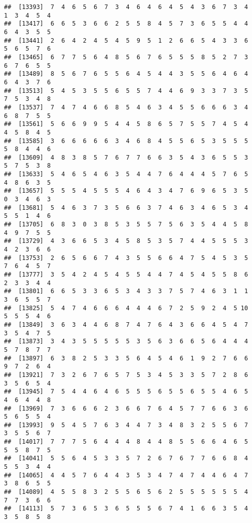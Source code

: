 \documentclass[
]{book}
\begin{document}
\begin{verbatim}
##  [13393]  7  4  6  5  6  7  3  4  6  4  6  4  5  4  3  6  7  3  4  1  3  4  5  4
##  [13417]  6  6  5  3  6  6  2  5  5  8  4  5  7  3  6  5  5  4  4  6  4  3  5  5
##  [13441]  2  6  4  2  4  5  4  5  9  5  1  2  6  6  5  4  3  3  6  5  6  5  7  6
##  [13465]  6  7  7  5  6  4  8  5  6  7  6  5  5  5  8  5  2  7  3  6  7  6  5  5
##  [13489]  8  5  6  7  6  5  5  6  4  5  4  4  3  5  5  6  4  6  4  6  4  3  7  6
##  [13513]  5  4  5  3  5  5  6  5  5  7  4  4  6  9  3  3  7  3  5  7  5  3  4  8
##  [13537]  7  4  7  4  6  6  8  5  4  6  3  4  5  5  6  6  6  3  4  6  8  7  5  5
##  [13561]  5  6  6  9  9  5  4  4  5  8  6  5  7  5  5  7  4  5  4  4  5  8  4  5
##  [13585]  3  6  6  6  6  6  3  4  6  8  4  5  5  6  5  3  5  5  5  5  8  4  4  6
##  [13609]  4  8  3  8  5  7  6  7  7  6  6  3  5  4  3  6  5  5  3  5  7  5  3  8
##  [13633]  5  4  6  5  4  6  3  5  4  4  7  6  4  4  4  5  7  6  5  4  8  6  3  5
##  [13657]  5  5  5  4  5  5  5  4  6  4  3  4  7  6  9  6  5  3  5  0  3  4  6  3
##  [13681]  5  4  6  3  7  3  5  6  6  3  7  4  6  3  4  6  5  3  4  5  5  1  4  6
##  [13705]  6  8  3  0  3  8  5  3  5  5  7  5  6  3  5  4  4  5  8  4  9  7  5  5
##  [13729]  4  3  6  6  5  3  4  5  8  5  3  5  7  4  4  5  5  5  3  4  2  3  6  6
##  [13753]  2  6  5  6  6  7  4  3  5  5  6  6  4  7  5  4  5  3  5  7  6  4  5  7
##  [13777]  3  5  4  2  4  5  4  5  5  4  4  7  4  5  4  5  5  8  6  2  3  3  4  4
##  [13801]  6  6  5  3  3  6  5  3  4  3  3  7  5  7  4  6  3  1  1  3  6  5  5  7
##  [13825]  5  4  7  4  6  6  6  4  4  4  6  7  2  5  9  2  4  5 10  5  5  5  4  6
##  [13849]  3  6  3  4  4  6  8  7  4  7  6  4  3  6  6  4  5  4  7  3  5  4  7  5
##  [13873]  3  4  3  5  5  5  5  5  3  5  6  3  6  6  5  6  4  4  4  5  7  8  7  7
##  [13897]  6  3  8  2  5  3  3  5  6  4  5  4  6  1  9  2  7  6  6  9  7  2  6  4
##  [13921]  7  3  2  6  7  6  5  7  5  3  4  5  3  3  5  7  2  8  6  3  5  6  5  4
##  [13945]  7  5  4  4  6  4  6  5  5  5  6  5  5  6  5  5  4  6  5  4  6  4  4  8
##  [13969]  7  3  6  6  6  2  3  6  6  7  6  4  5  7  7  6  6  3  6  5  6  5  5  4
##  [13993]  9  5  4  5  7  6  3  4  4  7  3  4  8  3  2  5  5  6  7  3  5  5  6  7
##  [14017]  7  7  7  5  6  4  4  4  8  4  4  8  5  5  6  6  4  6  5  5  5  8  7  5
##  [14041]  5  5  6  4  5  3  3  5  7  2  6  7  6  7  7  6  6  8  4  5  5  3  4  4
##  [14065]  4  4  5  7  6  4  4  3  5  3  4  7  4  7  4  4  6  4  7  3  8  6  5  5
##  [14089]  4  5  5  8  3  2  5  5  6  5  6  2  5  5  5  5  5  5  4  7  7  3  6  6
##  [14113]  5  7  3  6  5  3  6  5  5  5  6  7  4  1  6  6  3  5  4  3  5  8  5  8

\end{verbatim}
\end{document}
